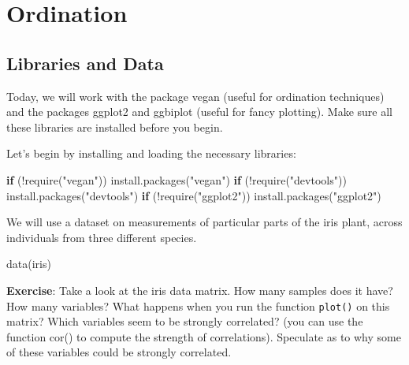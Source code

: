\documentclass[
]{book}
\newenvironment{Shaded}{\begin{snugshade}}{\end{snugshade}}
\newcommand{\ControlFlowTok}[1]{\textcolor[rgb]{0.13,0.29,0.53}{\textbf{#1}}}
\newcommand{\FunctionTok}[1]{\textcolor[rgb]{0.00,0.00,0.00}{#1}}
\newcommand{\NormalTok}[1]{#1}
\newcommand{\SpecialCharTok}[1]{\textcolor[rgb]{0.00,0.00,0.00}{#1}}
\newcommand{\StringTok}[1]{\textcolor[rgb]{0.31,0.60,0.02}{#1}}
\begin{document}
\hypertarget{ordination}{%
\chapter{Ordination}\label{ordination}}

\hypertarget{libraries-and-data}{%
\section{Libraries and Data}\label{libraries-and-data}}

Today, we will work with the package vegan (useful for ordination techniques) and the packages ggplot2 and ggbiplot (useful for fancy plotting). Make sure all these libraries are installed before you begin.

Let's begin by installing and loading the necessary libraries:

\begin{Shaded}
\begin{Highlighting}[]
\ControlFlowTok{if}\NormalTok{ (}\SpecialCharTok{!}\FunctionTok{require}\NormalTok{(}\StringTok{"vegan"}\NormalTok{)) }\FunctionTok{install.packages}\NormalTok{(}\StringTok{"vegan"}\NormalTok{)}
\ControlFlowTok{if}\NormalTok{ (}\SpecialCharTok{!}\FunctionTok{require}\NormalTok{(}\StringTok{"devtools"}\NormalTok{)) }\FunctionTok{install.packages}\NormalTok{(}\StringTok{"devtools"}\NormalTok{)}
\ControlFlowTok{if}\NormalTok{ (}\SpecialCharTok{!}\FunctionTok{require}\NormalTok{(}\StringTok{"ggplot2"}\NormalTok{)) }\FunctionTok{install.packages}\NormalTok{(}\StringTok{"ggplot2"}\NormalTok{)}
\end{Highlighting}
\end{Shaded}

We will use a dataset on measurements of particular parts of the iris plant, across individuals from three different species.

\begin{Shaded}
\begin{Highlighting}[]
\FunctionTok{data}\NormalTok{(iris)}
\end{Highlighting}
\end{Shaded}

\textbf{Exercise}: Take a look at the iris data matrix. How many samples does it have? How many variables? What happens when you run the function \texttt{plot()} on this matrix? Which variables seem to be strongly correlated? (you can use the function cor() to compute the strength of correlations). Speculate as to why some of these variables could be strongly correlated.
\end{document}
